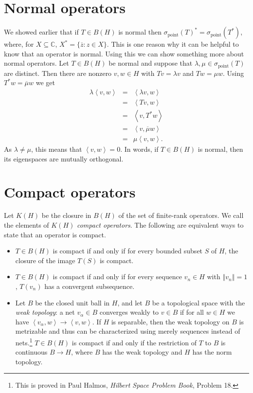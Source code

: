 \documentclass{article}
\newcommand{\inner}[2]{\left\langle #1, #2 \right\rangle}
\newcommand{\point}{\sigma_{\textrm{point}}}
\newcommand{\norm}[1]{\left\Vert #1 \right\Vert}
\begin{document}
\section{Normal operators}
We showed earlier that if $T \in B(H)$ is normal then $\point(T)^*=\point(T^*)$, where, for
$X \subseteq \mathbb{C}$, $X^*=\{\overline{z}:z \in X\}$. This is one reason why it can be helpful to know that an operator
is normal. Using this we can show something more about normal operators. 
Let $T \in B(H)$ be normal and suppose that $\lambda,\mu \in \point(T)$ are distinct. Then there are nonzero
$v,w \in H$ with $Tv=\lambda v$ and $Tw=\mu w$. Using $T^*w=\overline{\mu}w$ we get 
\begin{eqnarray*}
\lambda \inner{v}{w}&=&\inner{\lambda v}{w}\\
&=&\inner{Tv}{w}\\
&=&\inner{v}{T^*w}\\
&=&\inner{v}{\overline{\mu}w}\\
&=&\mu \inner{v}{w}.
\end{eqnarray*}
As $\lambda \neq \mu$, this means that $\inner{v}{w}=0$. In words, if $T \in B(H)$ is normal, then its
eigenspaces are mutually orthogonal.


\section{Compact operators}
Let $K(H)$ be the closure in $B(H)$
of the set of finite-rank operators. We call the elements of $K(H)$ {\em compact operators}. The following are equivalent ways to state that an operator
is compact.
\begin{itemize}
\item $T \in B(H)$ is compact if and only if
for every bounded subset $S$ of $H$, the closure of the image $T(S)$ is compact.
\item $T \in B(H)$ is compact if and only if for every sequence $v_n \in H$ with $\norm{v_n}=1$, 
$T(v_n)$ has a convergent subsequence.
\item Let $B$ be the closed unit ball in $H$, and let $B$ be a topological space with the {\em weak topology}: a net $v_\alpha \in B$ converges weakly to
$v \in B$ if for all $w \in H$ we have $\inner{v_\alpha}{w} \to \inner{v}{w}$. If $H$ is separable, then the weak topology on $B$ is metrizable and thus can be characterized
using merely sequences instead of nets.\footnote{This is proved
in Paul Halmos, {\em Hilbert Space Problem Book}, Problem 18.} $T \in B(H)$ is compact if and only if the restriction of $T$ to $B$ is continuous
$B \to H$, where $B$ has the weak topology and $H$ has the norm topology.
\end{itemize}
\end{document}

